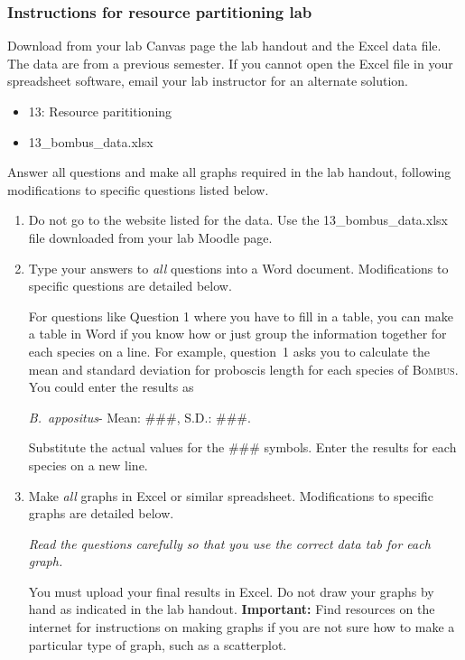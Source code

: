 \documentclass[12pt]{exam}
\begin{document}
\subsubsection*{Instructions for resource partitioning lab}

Download from your lab Canvas page the lab handout and the Excel data file. The data are from a previous semester. If you cannot open the Excel file in your spreadsheet software, email your lab instructor for an alternate solution.

\begin{itemize}
\item 13: Resource parititioning
\item 13\_bombus\_data.xlsx
\end{itemize}

Answer all questions and make all graphs required in the lab handout, following modifications to specific questions listed below.

\begin{enumerate}

\item Do not go to the website listed for the data. Use the 13\_bombus\_data.xlsx file downloaded from your lab Moodle page.

\item Type your answers to \emph{all} questions into a Word document. Modifications to specific questions are detailed below.

 For questions like Question 1 where you have to fill in a table, you can make a table in Word if you know how or just group the information together for each species on a line. For example, question~1 asks you to calculate the mean and standard deviation for proboscis length for each species of \textsc{Bombus.} You could enter the results as

\textit{B.~appositus}- Mean: \#\#\#, S.D.: \#\#\#.

Substitute the actual values for the \#\#\# symbols. Enter the results for each species on a new line.

\item Make \emph{all} graphs in Excel or similar spreadsheet. Modifications to specific graphs are detailed below. 

\emph{Read the questions carefully so that you use the correct data tab for each graph.}

You must upload your final results in Excel. Do not draw your graphs by hand as indicated in the lab handout. \textbf{Important:} Find resources on the internet for instructions on making graphs if you are not sure how to make a particular type of graph, such as a scatterplot.

\end{enumerate}
\end{document}
